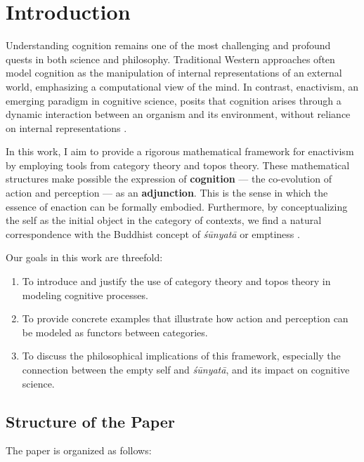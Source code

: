 \documentclass{article}
\begin{document}
\section{Introduction}

Understanding cognition remains one of the most challenging and profound quests in both science and philosophy. Traditional Western approaches often model cognition as the manipulation of internal representations of an external world, emphasizing a computational view of the mind. In contrast, enactivism, an emerging paradigm in cognitive science, posits that cognition arises through a dynamic interaction between an organism and its environment, without reliance on internal representations \cite{varela1991}.

In this work, I aim to provide a rigorous mathematical framework for enactivism by employing tools from category theory and topos theory. These mathematical structures make possible the expression of \textbf{cognition} --- the co-evolution of action and perception --- as an \textbf{adjunction}. This is the sense in which the essence of enaction can be formally embodied. Furthermore, by conceptualizing the self as the initial object in the category of contexts, we find a natural correspondence with the Buddhist concept of \emph{śūnyatā} or emptiness \cite{garfield1995}.

Our goals in this work are threefold:

\begin{enumerate}
    \item To introduce and justify the use of category theory and topos theory in modeling cognitive processes.
    \item To provide concrete examples that illustrate how action and perception can be modeled as functors between categories.
    \item To discuss the philosophical implications of this framework, especially the connection between the empty self and \emph{śūnyatā}, and its impact on cognitive science.

\end{enumerate}

\subsection{Structure of the Paper}

The paper is organized as follows:
\end{document}
